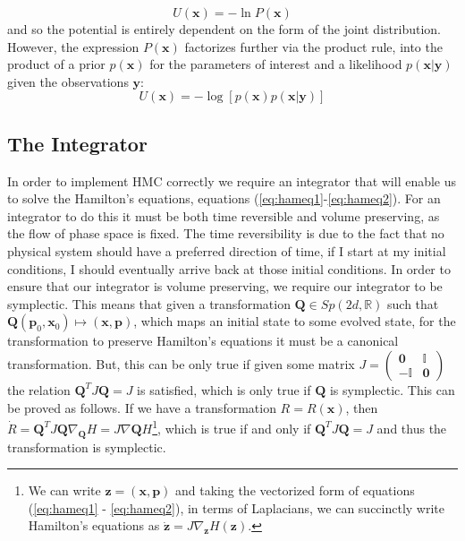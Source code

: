 \documentclass[twoside]{article}
\begin{document}
\begin{equation}
U(\textbf{x}) = -\ln P(\textbf{x})
\end{equation} and so the potential is entirely dependent on the form of the joint distribution. However, the expression $P(\textbf{x})$ factorizes further via the product rule,
into the product of a prior $p(\textbf{x})$ for the parameters of interest and a likelihood $p(\textbf{x}|\textbf{y})$ given the observations $\textbf{y}$: \begin{equation}
U(\textbf{x}) = -\log[p(\textbf{x})p(\textbf{x}|\textbf{y})]
\end{equation}

\subsection{The Integrator}

In order to implement HMC correctly we require an integrator that will enable us to solve the Hamilton's equations, equations (\ref{eq:hameq1}-\ref{eq:hameq2}). For an integrator to do this it must be both time reversible and volume preserving, as the flow of phase space is fixed. The time reversibility is due to the fact that no physical system should have a preferred direction of time, if I start at my initial conditions, I should eventually arrive back at those initial conditions. In order to ensure that our integrator is volume preserving, we require our integrator to be symplectic. This means that given a transformation $\textbf{Q} \in Sp(2d, \mathbb{R})$ such that $\textbf{Q}(\textbf{p}_{0}, \textbf{x}_{0}) \mapsto (\textbf{x}, \textbf{p})$, which maps an initial state to some evolved state, for the transformation to preserve Hamilton's equations it must be a canonical transformation. But, this can be only true if given some matrix $J = \left(\begin{array}{cc} \mathbf{0} & \mathbb{I} \\ -\mathbb{I} & \mathbf{0}\end{array}\right)$ the relation $\textbf{Q}^{T}J\textbf{Q} = J$ is satisfied, which is only true if $\textbf{Q}$ is symplectic. This can be proved as follows. If we have a transformation $R = R(\textbf{x})$, then $\dot{R} = \textbf{Q}^{T}J\textbf{Q}\nabla_{\textbf{Q}}H = J\nabla{\textbf{Q}}H$\footnote{We can write $\textbf{z} = (\textbf{x}, \textbf{p})$ and taking the vectorized form of equations (\ref{eq:hameq1} - \ref{eq:hameq2}), in terms of Laplacians, we can succinctly write Hamilton's equations as $\dot{\textbf{z}} = J\nabla_{\textbf{z}}H(\textbf{z})$. }, which is true if and only if $\textbf{Q}^{T}J\textbf{Q} = J$ and thus the transformation is symplectic.
\end{document}
